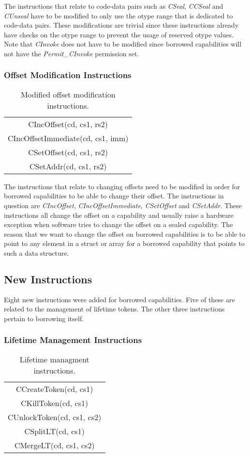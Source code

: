 The instructions that relate to code-data pairs such as \textit{CSeal}, \textit{CCSeal} and \textit{CUnseal} have to be modified to only use the otype range that is dedicated to code-data pairs. These modifications are trivial since these instructions already have checks on the otype range to prevent the usage of reserved otype values. Note that \textit{CInvoke} does not have to be modified since borrowed capabilities will not have the \textit{Permit\_CInvoke} permission set.

\subsubsection{Offset Modification Instructions}
\begin{table}[h]
\centering
\begin{tabular}{| c |}
\hline
 CIncOffset(cd, cs1, rs2) \\
 CIncOffsetImmediate(cd, cs1, imm) \\
 CSetOffset(cd, cs1, rs2) \\
 CSetAddr(cd, cs1, rs2) \\
\hline
\end{tabular}
\caption{Modified offset modification instructions.}
\label{table:borrowmodoffset}
\end{table}
The instructions that relate to changing offsets need to be modified in order for borrowed capabilities to be able to change their offset. The instructions in question are \textit{CIncOffset}, \textit{CIncOffsetImmediate}, \textit{CSetOffset} and \textit{CSetAddr}. These instructions all change the offset on a capability and usually raise a hardware exception when software tries to change the offset on a sealed capability. The reason that we want to change the offset on borrowed capabilities is to be able to point to any element in a struct or array for a borrowed capability that points to such a data structure.

\subsection{New Instructions}
Eight new instructions were added for borrowed capabilities. Five of these are related to the management of lifetime tokens. The other three instructions pertain to borrowing itself.

\subsubsection{Lifetime Management Instructions}
\label{sec:lifetimeinsts}
\begin{table}[h]
\centering
\begin{tabular}{| c |}
\hline
 CCreateToken(cd, cs1) \\
 CKillToken(cd, cs1) \\
 CUnlockToken(cd, cs1, cs2) \\
 CSplitLT(cd, cs1) \\
 CMergeLT(cd, cs1, cs2) \\
\hline
\end{tabular}
\caption{Lifetime managment instructions.}
\label{table:borrowedinstslifetime}
\end{table}

